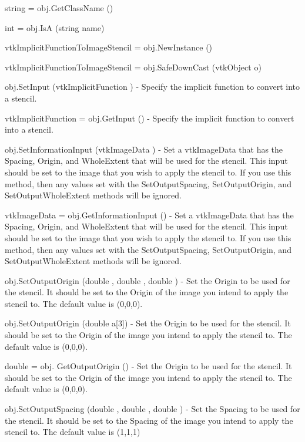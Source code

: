 \begin{DoxyItemize}
\item {\ttfamily string = obj.\-Get\-Class\-Name ()}  
\item {\ttfamily int = obj.\-Is\-A (string name)}  
\item {\ttfamily vtk\-Implicit\-Function\-To\-Image\-Stencil = obj.\-New\-Instance ()}  
\item {\ttfamily vtk\-Implicit\-Function\-To\-Image\-Stencil = obj.\-Safe\-Down\-Cast (vtk\-Object o)}  
\item {\ttfamily obj.\-Set\-Input (vtk\-Implicit\-Function )} -\/ Specify the implicit function to convert into a stencil.  
\item {\ttfamily vtk\-Implicit\-Function = obj.\-Get\-Input ()} -\/ Specify the implicit function to convert into a stencil.  
\item {\ttfamily obj.\-Set\-Information\-Input (vtk\-Image\-Data )} -\/ Set a vtk\-Image\-Data that has the Spacing, Origin, and Whole\-Extent that will be used for the stencil. This input should be set to the image that you wish to apply the stencil to. If you use this method, then any values set with the Set\-Output\-Spacing, Set\-Output\-Origin, and Set\-Output\-Whole\-Extent methods will be ignored.  
\item {\ttfamily vtk\-Image\-Data = obj.\-Get\-Information\-Input ()} -\/ Set a vtk\-Image\-Data that has the Spacing, Origin, and Whole\-Extent that will be used for the stencil. This input should be set to the image that you wish to apply the stencil to. If you use this method, then any values set with the Set\-Output\-Spacing, Set\-Output\-Origin, and Set\-Output\-Whole\-Extent methods will be ignored.  
\item {\ttfamily obj.\-Set\-Output\-Origin (double , double , double )} -\/ Set the Origin to be used for the stencil. It should be set to the Origin of the image you intend to apply the stencil to. The default value is (0,0,0).  
\item {\ttfamily obj.\-Set\-Output\-Origin (double a\mbox{[}3\mbox{]})} -\/ Set the Origin to be used for the stencil. It should be set to the Origin of the image you intend to apply the stencil to. The default value is (0,0,0).  
\item {\ttfamily double = obj. Get\-Output\-Origin ()} -\/ Set the Origin to be used for the stencil. It should be set to the Origin of the image you intend to apply the stencil to. The default value is (0,0,0).  
\item {\ttfamily obj.\-Set\-Output\-Spacing (double , double , double )} -\/ Set the Spacing to be used for the stencil. It should be set to the Spacing of the image you intend to apply the stencil to. The default value is (1,1,1)  

\end{DoxyItemize}
